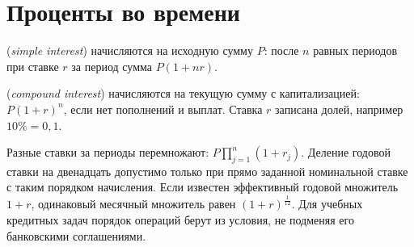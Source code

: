 \section{Проценты во времени}
\begin{definition} (\emph{simple interest}) начисляются на исходную сумму \(P\): после \(n\) равных периодов при ставке \(r\) за период сумма \(P(1+nr)\). \par{} (\emph{compound interest}) начисляются на текущую сумму с капитализацией: \(P(1+r)^n\), если нет пополнений и выплат. Ставка \(r\) записана долей, например \(10\%=0{,}1\).\end{definition}
Разные ставки за периоды перемножают: \(P\prod_{j=1}^n(1+r_j)\). Деление годовой ставки на двенадцать допустимо только при прямо заданной номинальной ставке с таким порядком начисления. Если известен эффективный годовой множитель \(1+r\), одинаковый месячный множитель равен \((1+r)^{\frac{1}{12}}\). Для учебных кредитных задач порядок операций берут из условия, не подменяя его банковскими соглашениями.
